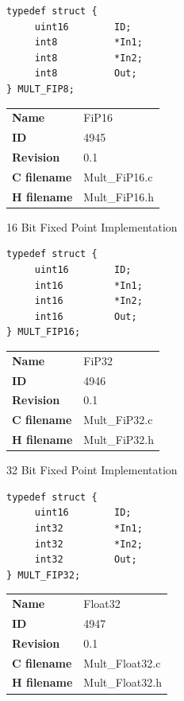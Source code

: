 \begin{lstlisting}
typedef struct {
     uint16        ID;
     int8          *In1;
     int8          *In2;
     int8          Out;
} MULT_FIP8;
\end{lstlisting}

\ifdefined \AddTestReports
{}
\fi
{}
\nopagebreak[0]
\begin{tabular}{l l}
\textbf{Name} & FiP16 \tabularnewline
\textbf{ID} & 4945 \tabularnewline
\textbf{Revision} & 0.1 \tabularnewline
\textbf{C filename} & Mult\_FiP16.c \tabularnewline
\textbf{H filename} & Mult\_FiP16.h \tabularnewline
\end{tabular}
\vspace{1ex}

16 Bit Fixed Point Implementation

\begin{lstlisting}
typedef struct {
     uint16        ID;
     int16         *In1;
     int16         *In2;
     int16         Out;
} MULT_FIP16;
\end{lstlisting}

\ifdefined \AddTestReports
{}
\fi
{}
\nopagebreak[0]
\begin{tabular}{l l}
\textbf{Name} & FiP32 \tabularnewline
\textbf{ID} & 4946 \tabularnewline
\textbf{Revision} & 0.1 \tabularnewline
\textbf{C filename} & Mult\_FiP32.c \tabularnewline
\textbf{H filename} & Mult\_FiP32.h \tabularnewline
\end{tabular}
\vspace{1ex}

32 Bit Fixed Point Implementation

\begin{lstlisting}
typedef struct {
     uint16        ID;
     int32         *In1;
     int32         *In2;
     int32         Out;
} MULT_FIP32;
\end{lstlisting}

\ifdefined \AddTestReports
{}
\fi
{}
\nopagebreak[0]
\begin{tabular}{l l}
\textbf{Name} & Float32 \tabularnewline
\textbf{ID} & 4947 \tabularnewline
\textbf{Revision} & 0.1 \tabularnewline
\textbf{C filename} & Mult\_Float32.c \tabularnewline
\textbf{H filename} & Mult\_Float32.h \tabularnewline
\end{tabular}
\vspace{1ex}

